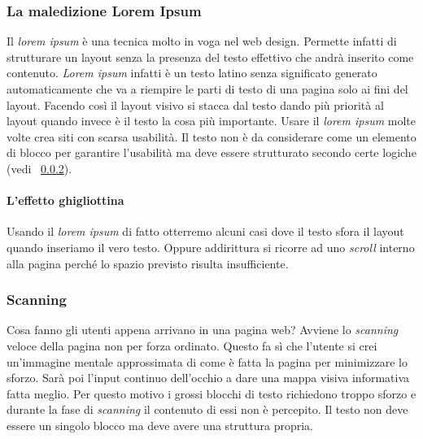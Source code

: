 			\subsubsection{La maledizione Lorem Ipsum}
				Il \emph{lorem ipsum} è una tecnica molto in voga nel web design. Permette infatti di strutturare un layout senza la presenza del testo effettivo che andrà inserito come contenuto. \emph{Lorem ipsum} infatti è un testo latino senza significato generato automaticamente che va a riempire le parti di testo di una pagina solo ai fini del layout.
				Facendo così il layout visivo si stacca dal testo dando più priorità al layout quando invece è il testo la cosa più importante. Usare il \emph{lorem ipsum} molte volte crea siti con scarsa usabilità.
				Il testo non è da considerare come un elemento di blocco per garantire l'usabilità ma deve essere strutturato secondo certe logiche (vedi ~\ref{sec:scanning}).
				
				\paragraph{L'effetto ghigliottina}
					Usando il \emph{lorem ipsum} di fatto otterremo alcuni casi dove il testo sfora il layout quando inseriamo il vero testo. Oppure addirittura si ricorre ad uno \emph{scroll} interno alla pagina perché lo spazio previsto risulta insufficiente. 
				
			\subsubsection{Scanning}
				\label{sec:scanning}
				Cosa fanno gli utenti appena arrivano in una pagina web? Avviene lo \emph{scanning} veloce della pagina non per forza ordinato. Questo fa sì che l'utente si crei un'immagine mentale approssimata di come è fatta la pagina per minimizzare lo sforzo. Sarà poi l'input continuo dell'occhio a dare una mappa visiva informativa fatta meglio. Per questo motivo i grossi blocchi di testo richiedono troppo sforzo e durante la fase di \emph{scanning} il contenuto di essi non è percepito. Il testo non deve essere un singolo blocco ma deve avere una struttura propria.
			
